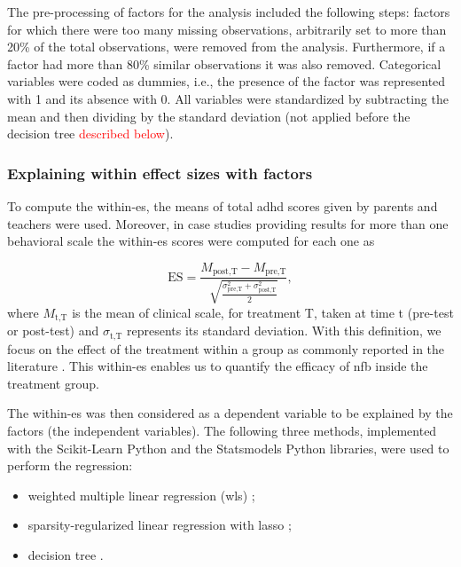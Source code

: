 The pre-processing of factors for the analysis included the following steps: factors for which there were too many 
missing observations, arbitrarily set to more than 20\% of the total observations, were removed from the analysis. 
Furthermore, if a factor had more than 80\% similar observations it was also removed. Categorical variables were 
coded as dummies, i.e., the presence of the factor was represented with 1 and its absence with 0. All variables 
were standardized by subtracting the mean and then dividing by the standard deviation (not applied before the decision tree \textcolor{red}{described below}).

\subsubsection{Explaining within effect sizes with factors}

To compute the within-\gls{es}, the  means of total \gls{adhd} scores given by parents and teachers were used. Moreover, 
in case studies providing results for more than one behavioral scale the within-\gls{es} scores were computed for each one as 

\begin{equation*}
\label{eq:factors_effect_size_within_subject}
\text{ES} = \frac{M_{\text{post,T}} - M_{\text{pre,T}}}{\sqrt{\frac{\sigma_{\text{pre,T}}^2 + \sigma_{\text{post,T}}^2}{2}}},
\end{equation*} 
\noindent where $M_{\text{t,T}}$ is the mean of clinical scale, for treatment T, taken at time t (pre-test or post-test) and $\sigma_{\text{t,T}}$ represents 
its standard deviation. With this definition, we focus on the effect of the treatment within a group \citep{Cohen1988} as commonly reported 
in the literature \citep{Arns2009, Maurizio2014, Strehl2017}. This within-\gls{es} enables us to quantify 
the efficacy of \gls{nfb} inside the treatment group. 

The within-\gls{es} was then considered as a dependent variable to be explained by the factors (the independent variables). 
The following three methods, implemented with the Scikit-Learn Python \citep[version 0.18.1]{Pedregosa2011} and the Statsmodels Python
\citep[version 0.8.0]{Seabold2010} libraries, were used to perform the regression:
\begin{itemize}
  \item weighted multiple linear regression (\gls{wls}) \citep{Montgomery2012};
	\item sparsity-regularized linear regression with \gls{lasso} \citep{Tibshirani1996};
	\item decision tree \citep{Quinlan1986}.
\end{itemize}

